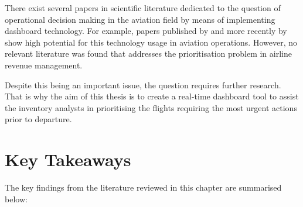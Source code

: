 There exist several papers in scientific literature dedicated to the question of operational decision making in the aviation field by means of implementing dashboard technology. For example, papers published by \citet{RakshitKrishnamurthyYu1996} and more recently by \citet{Salleh2023} show high potential for this technology usage in aviation operations. However, no relevant literature was found that addresses the prioritisation problem in airline revenue management.

Despite this being an important issue, the question requires further research. That is why the aim of this thesis is to create a real-time dashboard tool to assist the inventory analysts in prioritising the flights requiring the most urgent actions prior to departure.

\section{Key Takeaways}

The key findings from the literature reviewed in this chapter are summarised below:

